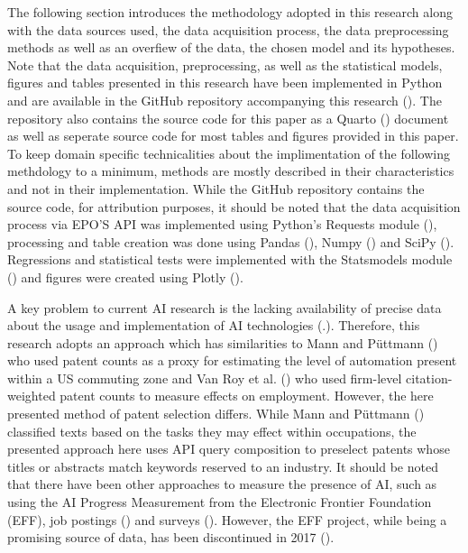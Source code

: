 \documentclass[
  12pt,
  a4paperpaper,
]{article}
\begin{document}
The following section introduces the methodology adopted in this
research along with the data sources used, the data acquisition process,
the data preprocessing methods as well as an overfiew of the data, the
chosen model and its hypotheses. Note that the data acquisition,
preprocessing, as well as the statistical models, figures and tables
presented in this research have been implemented in Python and are
available in the GitHub repository accompanying this research
(). The repository also
contains the source code for this paper as a Quarto
() document as
well as seperate source code for most tables and figures provided in
this paper. To keep domain specific technicalities about the
implimentation of the following methdology to a minimum, methods are
mostly described in their characteristics and not in their
implementation. While the GitHub repository contains the source code,
for attribution purposes, it should be noted that the data acquisition
process via EPO'S API was implemented using Python's Requests module
(),
processing and table creation was done using Pandas
(), Numpy
() and SciPy
(). Regressions
and statistical tests were implemented with the Statsmodels module
()
and figures were created using Plotly
().

A key problem to current AI research is the lacking availability of
precise data about the usage and implementation of AI technologies
(.).
Therefore, this research adopts an approach which has similarities to
Mann and Püttmann () who
used patent counts as a proxy for estimating the level of automation
present within a US commuting zone and Van Roy et al.
() who used firm-level
citation-weighted patent counts to measure effects on employment.
However, the here presented method of patent selection differs. While
Mann and Püttmann () classified
texts based on the tasks they may effect within occupations, the
presented approach here uses API query composition to preselect patents
whose titles or abstracts match keywords reserved to an industry. It
should be noted that there have been other approaches to measure the
presence of AI, such as using the AI Progress Measurement from the
Electronic Frontier Foundation (EFF), job postings
() and
surveys (). However, the EFF project, while being a promising
source of data, has been discontinued in 2017
().
\end{document}
